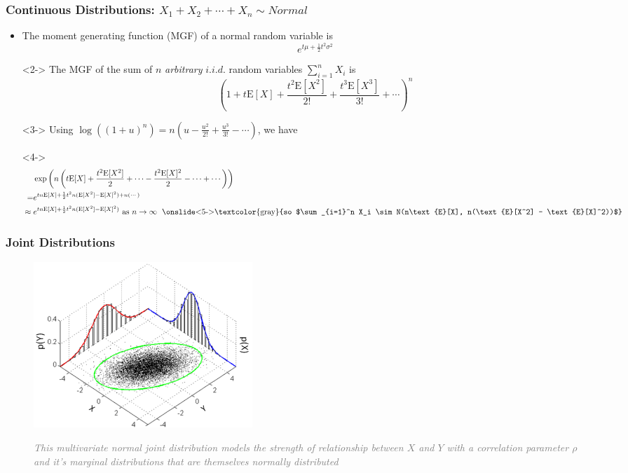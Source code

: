 \documentclass[xcolor={dvipsnames}]{beamer}
\begin{document}
\frame
{
 \frametitle{Continuous Distributions: $X_1+X_2+\cdots+X_n \sim Normal $}
 \scriptsize
 
\begin{itemize}
\item The moment generating function (MGF) of a normal random variable is
$$ e^{t\mu + \frac{1}{2}t^2\sigma^2}$$ 
\item[]<2-> The MGF of the sum of $n$ \emph{arbitrary} $i.i.d.$ random variables 
$\sum_{i=1}^n X_i$ is 
$$\left(1 + t \text{E}[X] + \frac{t^2 \text{E}[X^2]}{2!} + \frac{t^3 \text{E}[X^3]}{3!} + \cdots\right)^n$$ 
\item[]<3-> Using $\log\left((1+u)^n\right) = n\left(u - \frac{u^2}{2!} + \frac{u^3}{3!} - \cdots \right)$, we have
\item[]<4->
\begin{align*}
{} & \exp\left(n\left(  t \text{E}[X] + \frac{t^2 \text{E}[X^2]}{2} + \cdots -  \frac{t^2 \text{E}[X]^2}{2} - \cdots + \cdots  \right)\right)\\
 = & e^{t n\text{E}[X] + \frac{1}{2}t^2 n(\text{E}[X^2] - \text{E}[X]^2) + n(\cdots )}\\
\approx {} & e^{t n\text{E}[X] + \frac{1}{2}t^2 n(\text{E}[X^2] - \text{E}[X]^2)} \text{
as $n \rightarrow \infty \;$ \onslide<5->{\textcolor{gray}{so $\sum_{i=1}^n X_i \sim N(n\text{E}[X], n(\text{E}[X^2] - \text{E}[X]^2))$}}} 
\end{align*}
\footnotesize
{}
\end{itemize} 
}



\frame
{
 \frametitle{Joint Distributions}

\begin{figure}
\centering
\includegraphics[width=3.25in]{stuff/joint.png} 

\textcolor{gray}{\emph{This multivariate normal joint distribution models the strength of relationship between $X$ and $Y$ with a correlation parameter $\rho$ and it's marginal distributions that are themselves normally distributed}}
\end{figure}
}
\end{document}
